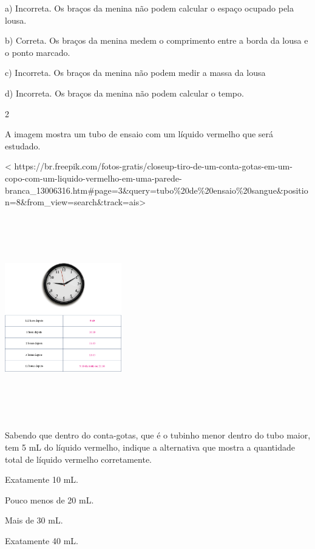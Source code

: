 {{a) Incorreta. Os braços da menina não podem calcular o espaço ocupado
pela lousa.

b) Correta. Os braços da menina medem o comprimento entre a borda da
lousa e o ponto marcado.

c) Incorreta. Os braços da menina não podem medir a massa da lousa

d) Incorreta. Os braços da menina não podem calcular o tempo.

\num{2}

A imagem mostra um tubo de ensaio com um líquido vermelho que será estudado.

\textless{}
https://br.freepik.com/fotos-gratis/closeup-tiro-de-um-conta-gotas-em-um-copo-com-um-liquido-vermelho-em-uma-parede-branca\_13006316.htm\#page=3\&query=tubo\%20de\%20ensaio\%20sangue\&position=8\&from\_view=search\&track=ais\textgreater{}

\includegraphics[width=2.00003in,height=3.45840in]{media/image56.png}

Sabendo que dentro do conta-gotas, que é o tubinho menor dentro do tubo
maior, tem 5 mL do líquido vermelho, indique a alternativa que mostra a
quantidade total de líquido vermelho corretamente.

\begin{escolha}
\item Exatamente 10 mL.

\item Pouco menos de 20 mL.

\item Mais de 30 mL.

\item Exatamente 40 mL.
\end{escolha}

}}
